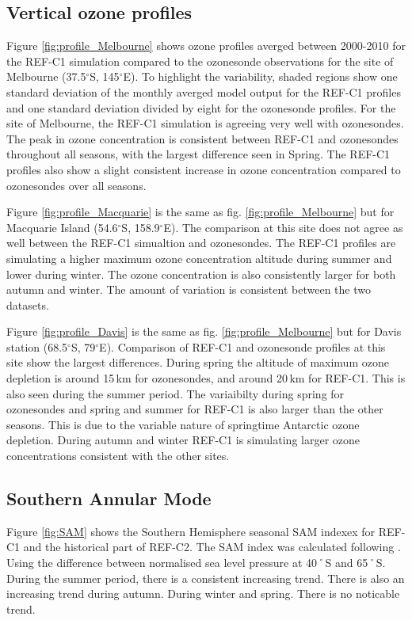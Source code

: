 \subsection{Vertical ozone profiles}
Figure \ref{fig:profile_Melbourne} shows ozone profiles averged between 2000-2010 for the REF-C1 simulation compared to the ozonesonde observations for the site of Melbourne (37.5$^\circ$S, 145$^\circ$E). To highlight the variability, shaded regions show one standard deviation of the monthly averged model output for the REF-C1 profiles and one standard deviation divided by eight for the ozonesonde profiles. For the site of Melbourne, the REF-C1 simulation is agreeing very well with ozonesondes. The peak in ozone concentration is consistent between REF-C1 and ozonesondes throughout all seasons, with the largest difference seen in Spring. The REF-C1 profiles also show a slight consistent increase in ozone concentration compared to ozonesondes over all seasons.

Figure \ref{fig:profile_Macquarie} is the same as fig. \ref{fig:profile_Melbourne} but for Macquarie Island (54.6$^\circ$S, 158.9$^\circ$E). The comparison at this site does not agree as well between the REF-C1 simualtion and ozonesondes. The REF-C1 profiles are simulating a higher maximum ozone concentration altitude during summer and lower during winter. The ozone concentration is also consistently larger for both autumn and winter. The amount of variation is consistent between the two datasets.

Figure \ref{fig:profile_Davis} is the same as fig. \ref{fig:profile_Melbourne} but for Davis station (68.5$^\circ$S, 79$^\circ$E). Comparison of REF-C1 and ozonesonde profiles at this site show the largest differences. During spring the altitude of maximum ozone depletion is around 15\,km for ozonesondes, and around 20\,km for REF-C1. This is also seen during the summer period. The variaibilty during spring for ozonesondes and spring and summer for REF-C1 is also larger than the other seasons. This is due to the variable nature of springtime Antarctic ozone depletion. During autumn and winter REF-C1 is simulating larger ozone concentrations consistent with the other sites. 

\subsection{Southern Annular Mode}
Figure \ref{fig:SAM} shows the Southern Hemisphere seasonal SAM indexex for REF-C1 and the historical part of REF-C2.  The SAM index was calculated following \cite{DaoyiGong:2007vm}. Using the difference between normalised sea level pressure at 40˚S and 65˚S. During the summer period, there is a consistent increasing trend. There is also an increasing trend during autumn. During winter and spring. There is no noticable trend.

